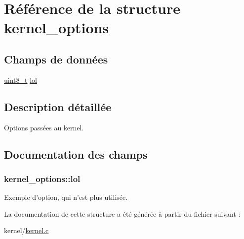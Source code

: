\hypertarget{structkernel__options}{\section{Référence de la structure kernel\-\_\-options}
\label{structkernel__options}
}
\subsection*{Champs de données}
\begin{DoxyCompactItemize}
\item 
\hyperlink{kernel_2include_2types_8h_aba7bc1797add20fe3efdf37ced1182c5}{uint8\-\_\-t} \hyperlink{structkernel__options_aaf8b5378f13106d9ddbc9e392e7f0367}{lol}
\end{DoxyCompactItemize}


\subsection{Description détaillée}
Options passées au kernel. 

\subsection{Documentation des champs}
\hypertarget{structkernel__options_aaf8b5378f13106d9ddbc9e392e7f0367}{
\subsubsection[{lol}]{ kernel\-\_\-options\-::lol}}\label{structkernel__options_aaf8b5378f13106d9ddbc9e392e7f0367}
Exemple d'option, qui n'est plus utilisée. 

La documentation de cette structure a été générée à partir du fichier suivant \-:\begin{DoxyCompactItemize}
\item 
kernel/\hyperlink{kernel_8c}{kernel.\-c}\end{DoxyCompactItemize}
